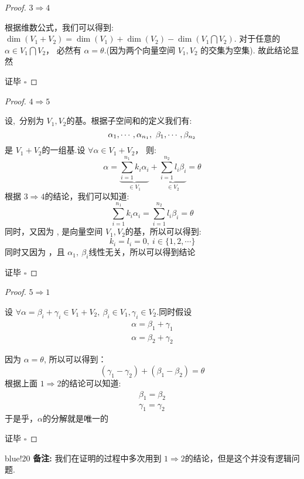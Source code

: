 \bigskip
\begin{proof}{${3} \Rightarrow {4}$}

    根据维数公式，我们可以得到: $\dim(V_1+V_2) =\dim(V_1) + \dim(V_2) -\dim(V_1\bigcap V_2)$.
    对于任意的 $\alpha\in V_1 \bigcap V_2$， 必然有 $\alpha =\theta$.(因为两个向量空间 $V_1, V_2$ 的交集为空集).
    故此结论显然\par 
    证毕 $\square$
\end{proof}

\bigskip
\begin{proof}{ ${4} \Rightarrow {5}$ }

    设\seq{\alpha},~\seq{\beta}分别为 $V_1, V_2$的基。根据子空间和的定义我们有:
    \[
        \seq[n_1]{\alpha},~\seq[n_2]{\beta}
    \]
    是 $V_1 +V_2$的一组基.设 $\forall \alpha\in V_1 +V_2$， 则:
    \[
        \alpha = \underbrace{\sum_{i=1}^{n_1}{k_i\alpha_i}}_{\in V_1} + \underbrace{\sum_{i=1}^{n_2}{l_i\beta_i}}_{\in V_2}  =\theta   
    \]
    根据 ${3} \Rightarrow {4}$的结论，我们可以知道:
    \[
        \sum_{i=1}^{n_1}{k_i\alpha_i} = \sum_{i=1}^{n_2}{l_i\beta_i}  =\theta
    \]
    同时，又因为 \seq[n_1]{\alpha}, \seq[n_2]{\beta}是向量空间 $V_1, V_2$的基，所以可以得到:
    \[
        k_i= l_i=0,~i \in \{1, 2, \cdots\}
    \]
    同时又因为 ，且 $\alpha_1, ~\beta_i$线性无关，所以可以得到结论\par 
    证毕 $\square$
\end{proof}

\begin{proof}{${5} \Rightarrow {1}$}

    设 $\forall \alpha  = \beta_i +\gamma_i \in V_1 + V_2,~ \beta_i\in V_1, \gamma_i \in V_2$.同时假设
    \begin{align*}
        \alpha =  \beta_1 + \gamma_1\\
        \alpha = \beta_2 + \gamma_2        
    \end{align*}

    因为 $\alpha =\theta$, 所以可以得到：
    \[
        (\gamma_1-\gamma_2) +  (\beta_1 -\beta_2) = \theta    
    \]
    根据上面 ${1} \Rightarrow {2}$的结论可以知道:
    \begin{align*}
        \beta_1 = \beta_2\\
        \gamma_1 = \gamma_2    
    \end{align*}
    于是乎，$\alpha$的分解就是唯一的\par 
    证毕 $\square$
\end{proof}


\begin{formal}{blue!20}
  {\bf 备注: }我们在证明的过程中多次用到 ${1} \Rightarrow {2}$的结论，但是这个并没有逻辑问题. 
\end{formal}